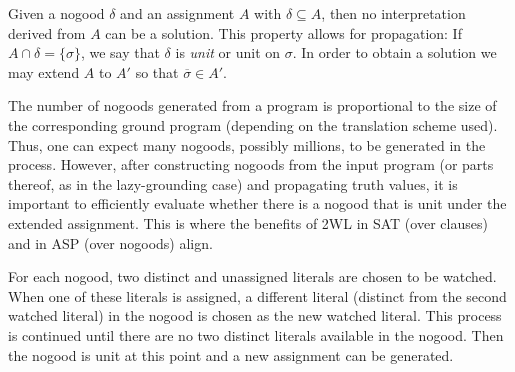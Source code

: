 \documentclass[final]{vutinfth} %
\newcommand{\ass}{A}
\newcommand{\bsgl}{\sigma}
\begin{document}
Given a nogood $\delta$ and an assignment $\ass$ with $\delta \subseteq \ass$, then no interpretation derived from $\ass$ can be a solution. This property allows for propagation: If $\ass \cap \delta = \{ \bsgl \}$, we say that $\delta$ is \emph{unit} or unit on $\bsgl$. In order to obtain a solution we may extend $\ass$ to $\ass'$ so that $\overline{\bsgl} \in \ass'$.

The number of nogoods generated from a program is proportional to the size of the corresponding ground program (depending on the translation scheme used). Thus, one can expect many nogoods, possibly millions, to be generated in the process. However, after constructing nogoods from the input program (or parts thereof, as in the lazy-grounding case) and propagating truth values, it is important to efficiently evaluate whether there is a nogood that is unit under the extended assignment. This is where the benefits of 2WL in SAT (over clauses) and in ASP (over nogoods) align.

For each nogood, two distinct and unassigned literals are chosen to be watched. When one of these literals is assigned, a different literal (distinct from the second watched literal) in the nogood is chosen as the new watched literal. This process is continued until there are no two distinct literals available in the nogood. Then the nogood is unit at this point and a new assignment can be generated.
\end{document}
